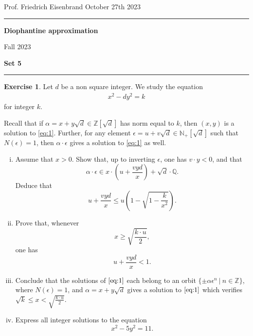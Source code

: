 \documentclass[12pt,a4paper]{article}
\date{}
\theoremstyle{plain}
\newtheorem*{Sol*}{Solution}
\theoremstyle{definition}
\newtheorem{Ex}{Exercise}
\def \N {\mathbb N}
\def \Q {\mathbb Q}
\def \Z {\mathbb Z}
\newif\ifsolutions
\newcommand{\exercise}[2]{
			\begin{Ex} #1 \end{Ex}
			\ifsolutions  \begin{Sol*} #2 \end{Sol*} \bigskip \else \bigskip  \fi
		}
\begin{document}
\begin{center}
{Prof. Friedrich Eisenbrand \hfill October 27th 2023}
\end{center}
	
\hrule\vspace{\baselineskip}

\begin{center}
\textbf{Diophantine approximation}

Fall 2023

\bigskip

\textbf{Set 5}
\ifsolutions{\textbf{- Solutions}} \else{} \fi
\end{center}

\hrule\vspace{\baselineskip}




\exercise{
	Let $d$ be a non square integer.
	We study the equation 
	\begin{align}\label{eq:1} x^2 - dy^2 = k \end{align}
	for integer $k$.

	Recall that if $\alpha = x + y\sqrt{d} \in \Z[\sqrt{d}]$ has norm equal to $k$, then $(x,y)$ is a solution to \eqref{eq:1}.
	Further, for any element $\epsilon = u + v \sqrt{d} \in \N_+[\sqrt{d}]$ such that $N(\epsilon)=1$, then $\alpha \cdot \epsilon$ gives a solution to \eqref{eq:1} as well.

	\begin{enumerate}[i)]
		\item Assume that $x > 0$. Show that, up to inverting $\epsilon$, one has $v \cdot y < 0$, and that
			\[ \alpha \cdot \epsilon \in x \cdot \left(u+ \frac{vyd}{x} \right) + \sqrt{d} \cdot \Q. \]
		Deduce that
			\[ u+ \frac{vyd}{x} \leq u \left( 1 - \sqrt{1-\frac{k}{x^2}} \right).\]

		\item Prove that, whenever
			\[ x \geq \sqrt{\frac{k \cdot u}{2}}, \]
		one has
			\[ u+ \frac{vyd}{x} < 1. \]

		\item Conclude that the solutions of $\eqref{eq:1}$ each belong to an orbit $\{ \pm \alpha \epsilon^n \ | \ n \in \Z \}$, where $N(\epsilon)=1$, and $\alpha = x + y\sqrt{d}$ gives a solution to $\eqref{eq:1}$ which verifies $\sqrt{k} \leq x < \sqrt{\frac{k \cdot u}{2}}$.
		
		\item Express all integer solutions to the equation
			\[ x^2 - 5y^2 = 11. \]
	\end{enumerate}

}
{}
\end{document}
